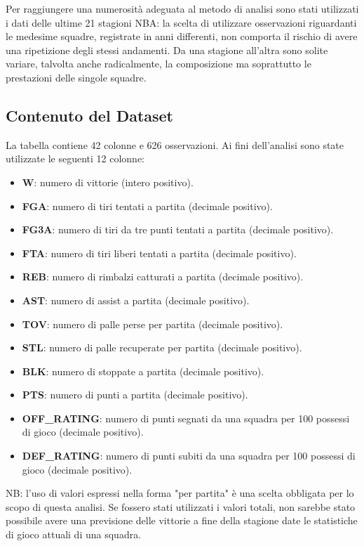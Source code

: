 \documentclass[11pt,a4paper]{article}
\begin{document}
Per raggiungere una numerosità adeguata al metodo di analisi sono stati utilizzati i dati delle ultime 21 stagioni NBA: la scelta di utilizzare osservazioni riguardanti le medesime squadre, registrate in anni differenti, non comporta il rischio di avere una ripetizione degli stessi andamenti. Da una stagione all'altra sono solite variare, talvolta anche radicalmente, la composizione ma soprattutto le prestazioni delle singole squadre. 

\subsection{Contenuto del Dataset}
La tabella contiene 42 colonne e 626 osservazioni. Ai fini dell'analisi sono state utilizzate le seguenti 12 colonne:
\begin{itemize}
    \item \textbf{W}: numero di vittorie (intero positivo).
    \item \textbf{FGA}: numero di tiri tentati a partita (decimale positivo).
    \item \textbf{FG3A}: numero di tiri da tre punti tentati a partita (decimale positivo).
    \item \textbf{FTA}: numero di tiri liberi tentati a partita (decimale positivo).
    \item \textbf{REB}: numero di rimbalzi catturati a partita (decimale positivo).
    \item \textbf{AST}: numero di assist a partita (decimale positivo).
    \item \textbf{TOV}: numero di palle perse per partita (decimale positivo).
    \item \textbf{STL}: numero di palle recuperate per partita (decimale positivo).
    \item \textbf{BLK}: numero di stoppate a partita (decimale positivo).
    \item \textbf{PTS}: numero di punti a partita (decimale positivo).
    \item \textbf{OFF\_RATING}: numero di punti segnati da una squadra per 100 possessi di gioco (decimale positivo).
    \item \textbf{DEF\_RATING}: numero di punti subiti da una squadra per 100 possessi di gioco (decimale positivo).
\end{itemize}

NB: l'uso di valori espressi nella forma "per partita" è una scelta obbligata per lo scopo di questa analisi. Se fossero stati utilizzati i valori totali, non sarebbe stato possibile avere una previsione delle vittorie a fine della stagione date le statistiche di gioco attuali di una squadra.
\end{document}
